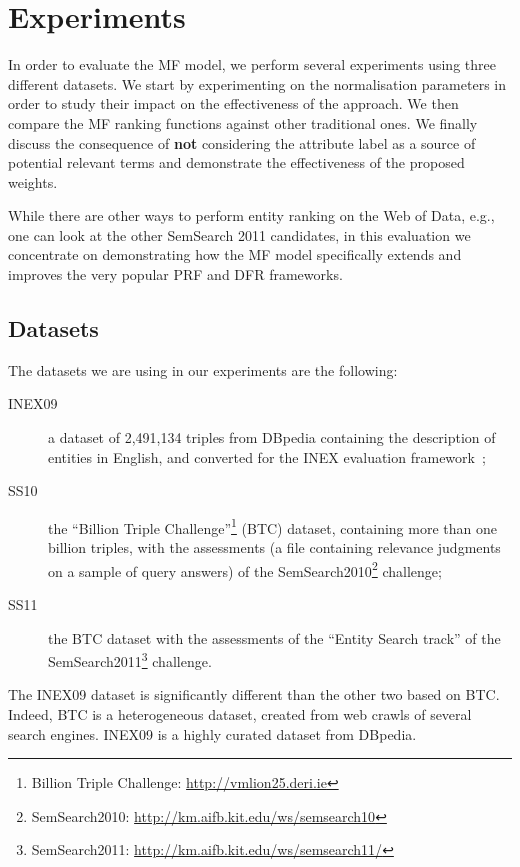 \section{Experiments}
\label{sec:experiments}

In order to evaluate the \gls{MF} model, we perform several experiments using three different datasets. We start by experimenting on the normalisation parameters in order to study their impact on the effectiveness of the approach. We then compare the \gls{MF} ranking functions against other traditional ones. We finally discuss the consequence of \textbf{not} considering the attribute label as a source of potential relevant terms and demonstrate the effectiveness of the proposed weights.

While there are other ways to perform entity ranking on the Web of Data, e.g., one can look at the other SemSearch 2011 candidates, in this evaluation we concentrate on demonstrating how the \gls{MF} model specifically extends and improves the very popular PRF and DFR frameworks.

\subsection{Datasets}
\label{sec:datasets}

The datasets we are using in our experiments are the following:
\begin{description}
  \item[INEX09] a dataset of 2,491,134 triples from DBpedia containing the description of entities in English, and converted for the INEX evaluation framework~\cite{Perez-Aguera:2010:UBS};
  \item[SS10] the ``Billion Triple Challenge''\footnote{Billion Triple Challenge: \url{http://vmlion25.deri.ie}} (BTC) dataset, containing more than one billion triples, with the assessments (a file containing relevance judgments on a sample of query answers) of the SemSearch2010\footnote{\label{ss10}SemSearch2010: \url{http://km.aifb.kit.edu/ws/semsearch10}} challenge;
  \item[SS11] the BTC dataset with the assessments of the ``Entity Search track'' of the SemSearch2011\footnote{\label{ss11}SemSearch2011: \url{http://km.aifb.kit.edu/ws/semsearch11/}} challenge.
\end{description}
The INEX09 dataset is significantly different than the other two based on BTC. Indeed, BTC is a heterogeneous dataset, created from web crawls of several search engines. INEX09 is a highly curated dataset from DBpedia.


